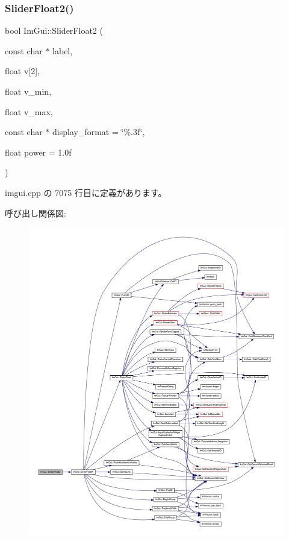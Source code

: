 \subsubsection{\texorpdfstring{Slider\+Float2()}{SliderFloat2()}}
{\footnotesize\ttfamily bool Im\+Gui\+::\+Slider\+Float2 (\begin{DoxyParamCaption}\item[{const char $\ast$}]{label,  }\item[{float}]{v\mbox{[}2\mbox{]},  }\item[{float}]{v\+\_\+min,  }\item[{float}]{v\+\_\+max,  }\item[{const char $\ast$}]{display\+\_\+format = {\ttfamily \char`\"{}\%.3f\char`\"{}},  }\item[{float}]{power = {\ttfamily 1.0f} }\end{DoxyParamCaption})}



 imgui.\+cpp の 7075 行目に定義があります。

呼び出し関係図\+:\nopagebreak
\begin{figure}[H]
\begin{center}
\leavevmode
\includegraphics[width=350pt]{namespace_im_gui_a0d5270d08284202523130e8b6ef66350_cgraph}
\end{center}
\end{figure}
\mbox{\label{namespace_im_gui_aab33732d7951627f9c32d708f263889f}} 
